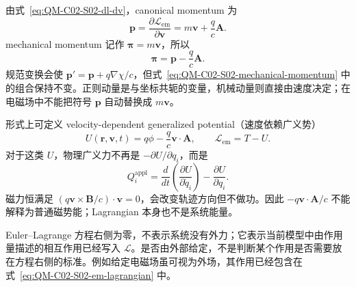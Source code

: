 
由式~\eqref{eq:QM-C02-S02-dl-dv}，canonical momentum 为
\begin{equation}
  \boxed{
  \bm p=\frac{\partial\mathcal L_{\mathrm{em}}}{\partial\bm v}
  =m\bm v+\frac qc\bm A.}
  \label{eq:QM-C02-S02-canonical-momentum}
\end{equation}
mechanical momentum 记作 $\bm\pi=m\bm v$，所以
\begin{equation}
  \boxed{\bm\pi=\bm p-\frac qc\bm A.}
  \label{eq:QM-C02-S02-mechanical-momentum}
\end{equation}
规范变换会使 $\bm p'=\bm p+q\nabla\chi/c$，但式~\eqref{eq:QM-C02-S02-mechanical-momentum} 中的组合保持不变。正则动量是与坐标共轭的变量，机械动量则直接由速度决定；在电磁场中不能把符号 $\bm p$ 自动替换成 $m\bm v$。

形式上可定义 velocity-dependent generalized potential（速度依赖广义势）
\begin{equation}
  U(\bm r,\bm v,t)
  =q\phi-\frac qc\bm v\cdot\bm A,
  \qquad
  \mathcal L_{\mathrm{em}}=T-U.
  \label{eq:QM-C02-S02-generalized-potential}
\end{equation}
对于这类 $U$，物理广义力不再是 $-\partial U/\partial q_i$，而是
\begin{equation}
  \boxed{
  Q_i^{\mathrm{appl}}
  =\frac{d}{dt}\left(\frac{\partial U}{\partial\dot q_i}\right)
  -\frac{\partial U}{\partial q_i}.}
  \label{eq:QM-C02-S02-velocity-potential-force}
\end{equation}
磁力恒满足 $(q\bm v\times\bm B/c)\cdot\bm v=0$，会改变轨迹方向但不做功。因此 $-q\bm v\cdot\bm A/c$ 不能解释为普通磁势能；Lagrangian 本身也不是系统能量。


Euler--Lagrange 方程右侧为零，不表示系统没有外力；它表示当前模型中由作用量描述的相互作用已经写入 $\mathcal L$。是否由外部给定，不是判断某个作用是否需要放在方程右侧的标准。例如给定电磁场虽可视为外场，其作用已经包含在式~\eqref{eq:QM-C02-S02-em-lagrangian} 中。

